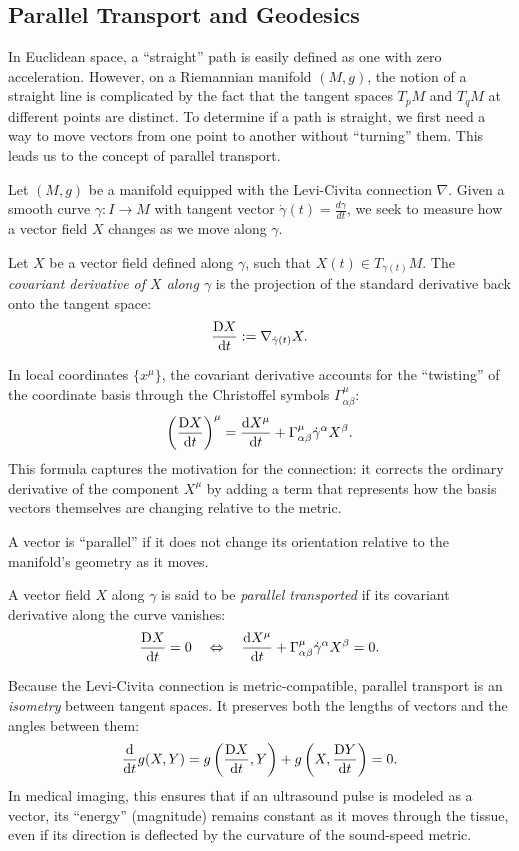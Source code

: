 \subsection{Parallel Transport and Geodesics} In Euclidean space, a ``straight'' path is easily defined as one with zero acceleration. However, on a Riemannian manifold $(M, g)$, the notion of a straight line is complicated by the fact that the tangent spaces $T_p M$ and $T_q M$ at different points are distinct. To determine if a path is straight, we first need a way to move vectors from one point to another without ``turning'' them. This leads us to the concept of parallel transport.

Let $(M, g)$ be a manifold equipped with the Levi-Civita connection $\nabla$. Given a smooth curve $\gamma: I \to M$ with tangent vector $\dot{\gamma}(t) = \frac{d\gamma}{dt}$, we seek to measure how a vector field $X$ changes as we move along $\gamma$.

\begin{definition}
  Let $X$ be a vector field defined along $\gamma$, such that $X(t) \in T_{\gamma(t)} M$. The \emph{covariant derivative of $X$ along $\gamma$} is the projection of the standard derivative back onto the tangent space:
  \[%
    \codv{X}{t} := \nabla_{\dot{\gamma}(t)} X
  .\]%
\end{definition}

In local coordinates $\{x^\mu\}$, the covariant derivative accounts for the ``twisting'' of the coordinate basis through the Christoffel symbols $\Gamma^\mu_{\alpha\beta}$:
\[%
  \left(\codv{X}{t}\right)^\mu = \odv{X^\mu}{t} + \Gamma^\mu_{\alpha\beta} \dot{\gamma}^\alpha X^\beta
.\]%
This formula captures the motivation for the connection: it corrects the ordinary derivative of the component $X^\mu$ by adding a term that represents how the basis vectors themselves are changing relative to the metric.

A vector is ``parallel'' if it does not change its orientation relative to the manifold's geometry as it moves.

\begin{definition}
  A vector field $X$ along $\gamma$ is said to be \emph{parallel transported} if its covariant derivative along the curve vanishes:
  \[%
    \codv{X}{t} = 0 \quad \iff \quad \odv{X^\mu}{t} + \Gamma^\mu_{\alpha\beta} \dot{\gamma}^\alpha X^\beta = 0
  .\]%
\end{definition}

Because the Levi-Civita connection is metric-compatible, parallel transport is an \emph{isometry} between tangent spaces. It preserves both the lengths of vectors and the angles between them:
\[%
  \odv{}{t} g(X, Y) = g\left(\codv{X}{t}, Y\right) + g\left(X, \codv{Y}{t}\right) = 0
.\]%
In medical imaging, this ensures that if an ultrasound pulse is modeled as a vector, its ``energy'' (magnitude) remains constant as it moves through the tissue, even if its direction is deflected by the curvature of the sound-speed metric.


